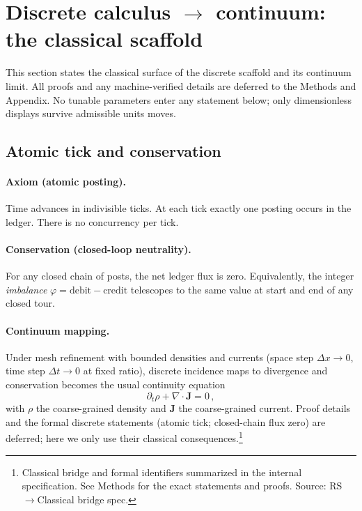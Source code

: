 \documentclass[11pt]{article}
\begin{document}


\section{Discrete calculus $\to$ continuum: the classical scaffold}

This section states the classical surface of the discrete scaffold and its continuum limit. All proofs and any machine-verified details are deferred to the Methods and Appendix. No tunable parameters enter any statement below; only dimensionless displays survive admissible units moves.

\subsection{Atomic tick and conservation}\label{subsec:atomicity-continuity}

\paragraph{Axiom (atomic posting).} Time advances in indivisible ticks. At each tick exactly one posting occurs in the ledger. There is no concurrency per tick.

\paragraph{Conservation (closed-loop neutrality).} For any closed chain of posts, the net ledger flux is zero. Equivalently, the integer \emph{imbalance} $\varphi=\text{debit}-\text{credit}$ telescopes to the same value at start and end of any closed tour.

\paragraph{Continuum mapping.} Under mesh refinement with bounded densities and currents (space step $\Delta x\to 0$, time step $\Delta t\to 0$ at fixed ratio), discrete incidence maps to divergence and conservation becomes the usual continuity equation
\begin{equation}
\partial_t \rho + \nabla\!\cdot\! \mathbf{J} = 0\,,
\end{equation}
with $\rho$ the coarse-grained density and $\mathbf{J}$ the coarse-grained current. Proof details and the formal discrete statements (atomic tick; closed-chain flux zero) are deferred; here we only use their classical consequences.\footnote{Classical bridge and formal identifiers summarized in the internal specification. See Methods for the exact statements and proofs. Source: RS$\to$Classical bridge spec. }
\end{document}
